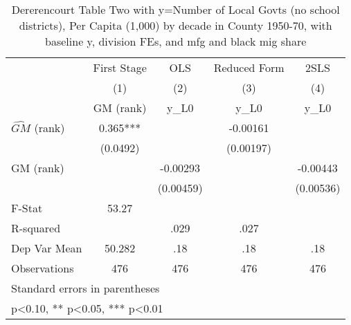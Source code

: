 \begin{table}[htbp]\centering
\def\sym#1{\ifmmode^{#1}\else\(^{#1}\)\fi}
\caption{Dererencourt Table Two with y=Number of Local Govts (no school districts), Per Capita (1,000) by decade in County 1950-70, with baseline y, division FEs, and mfg and black mig share}
\begin{tabular}{l*{4}{c}}
\toprule
                    & First Stage   &         OLS   &Reduced Form   &        2SLS   \\
                    &\multicolumn{1}{c}{(1)}&\multicolumn{1}{c}{(2)}&\multicolumn{1}{c}{(3)}&\multicolumn{1}{c}{(4)}\\
                    &\multicolumn{1}{c}{GM  (rank)}&\multicolumn{1}{c}{y\_L0}&\multicolumn{1}{c}{y\_L0}&\multicolumn{1}{c}{y\_L0}\\
\midrule
$\hat{GM}$ (rank)   &       0.365***&               &    -0.00161   &               \\
                    &    (0.0492)   &               &   (0.00197)   &               \\
\addlinespace
GM  (rank)          &               &    -0.00293   &               &    -0.00443   \\
                    &               &   (0.00459)   &               &   (0.00536)   \\
\midrule
F-Stat              &       53.27   &               &               &               \\
R-squared           &               &        .029   &        .027   &               \\
Dep Var Mean        &      50.282   &         .18   &         .18   &         .18   \\
Observations        &         476   &         476   &         476   &         476   \\
\bottomrule
\multicolumn{5}{l}{\footnotesize Standard errors in parentheses}\\
\multicolumn{5}{l}{\footnotesize * p<0.10, ** p<0.05, *** p<0.01}\\
\end{tabular}
\end{table}
